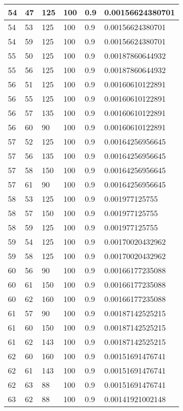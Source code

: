 \begin{longtable}{|l|l|l|l|l|l|}
54 & 47 & 125 & 100 & 0.9 & 0.00156624380701 \\ \hline
54 & 53 & 125 & 100 & 0.9 & 0.00156624380701 \\ \hline
54 & 59 & 125 & 100 & 0.9 & 0.00156624380701 \\ \hline
55 & 50 & 125 & 100 & 0.9 & 0.00187860644932 \\ \hline
55 & 56 & 125 & 100 & 0.9 & 0.00187860644932 \\ \hline
56 & 51 & 125 & 100 & 0.9 & 0.00160610122891 \\ \hline
56 & 55 & 125 & 100 & 0.9 & 0.00160610122891 \\ \hline
56 & 57 & 135 & 100 & 0.9 & 0.00160610122891 \\ \hline
56 & 60 & 90  & 100 & 0.9 & 0.00160610122891 \\ \hline
57 & 52 & 125 & 100 & 0.9 & 0.00164256956645 \\ \hline
57 & 56 & 135 & 100 & 0.9 & 0.00164256956645 \\ \hline
57 & 58 & 150 & 100 & 0.9 & 0.00164256956645 \\ \hline
57 & 61 & 90  & 100 & 0.9 & 0.00164256956645 \\ \hline
58 & 53 & 125 & 100 & 0.9 & 0.001977125755   \\ \hline
58 & 57 & 150 & 100 & 0.9 & 0.001977125755   \\ \hline
58 & 59 & 125 & 100 & 0.9 & 0.001977125755   \\ \hline
59 & 54 & 125 & 100 & 0.9 & 0.00170020432962 \\ \hline
59 & 58 & 125 & 100 & 0.9 & 0.00170020432962 \\ \hline
60 & 56 & 90  & 100 & 0.9 & 0.00166177235088 \\ \hline
60 & 61 & 150 & 100 & 0.9 & 0.00166177235088 \\ \hline
60 & 62 & 160 & 100 & 0.9 & 0.00166177235088 \\ \hline
61 & 57 & 90  & 100 & 0.9 & 0.00187142525215 \\ \hline
61 & 60 & 150 & 100 & 0.9 & 0.00187142525215 \\ \hline
61 & 62 & 143 & 100 & 0.9 & 0.00187142525215 \\ \hline
62 & 60 & 160 & 100 & 0.9 & 0.00151691476741 \\ \hline
62 & 61 & 143 & 100 & 0.9 & 0.00151691476741 \\ \hline
62 & 63 & 88  & 100 & 0.9 & 0.00151691476741 \\ \hline
63 & 62 & 88  & 100 & 0.9 & 0.00141921002148 \\ \hline

\end{longtable}
